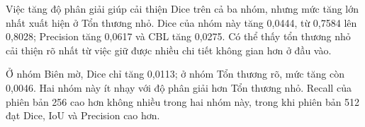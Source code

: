 \begin{table}[H]
    \centering
    \caption{Ảnh hưởng của độ phân giải đối với PGA-UNet theo đặc tính tổn thương trên FracAtlas (Bao trọn, 24 ảnh/nhóm)}
    \label{tab:fracatlas_subcat_pga_resolution}
    \renewcommand{\arraystretch}{1.3}
\end{table}

Việc tăng độ phân giải giúp cải thiện Dice trên cả ba nhóm, nhưng mức tăng lớn nhất xuất hiện ở Tổn thương nhỏ. Dice của nhóm này tăng 0,0444, từ 0,7584 lên 0,8028; Precision tăng 0,0617 và CBL tăng 0,0275. Có thể thấy tổn thương nhỏ cải thiện rõ nhất từ việc giữ được nhiều chi tiết không gian hơn ở đầu vào.

Ở nhóm Biên mờ, Dice chỉ tăng 0,0113; ở nhóm Tổn thương rõ, mức tăng còn 0,0046. Hai nhóm này ít nhạy với độ phân giải hơn Tổn thương nhỏ. Recall của phiên bản 256 cao hơn không nhiều trong hai nhóm này, trong khi phiên bản 512 đạt Dice, IoU và Precision cao hơn.

